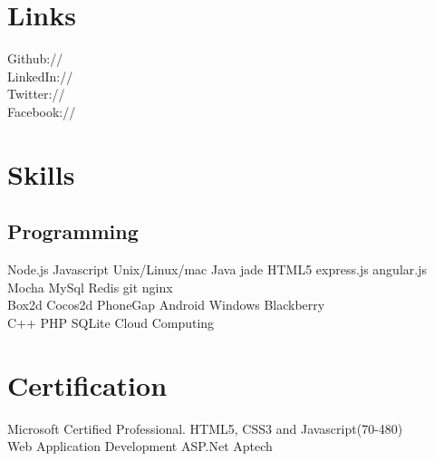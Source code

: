 \documentclass[]{deedy-resume-openfont}
\begin{document}
\begin{minipage}[t]{0.33\textwidth}

\section{Links} 
Github:// \href{https://github.com/niklabh}{} \\
LinkedIn://  \href{https://www.linkedin.com/in/niklabh}{} \\
Twitter://  \href{https://twitter.com/niklabh}{} \\
Facebook://  \href{https://facebook.com/niklabh}{}
\sectionsep


\section{Skills}
\subsection{Programming}
Node.js \textbullet{} Javascript \textbullet{}   Unix/Linux/mac \textbullet{} Java \textbullet{} jade \textbullet{} HTML5 \textbullet{} express.js \textbullet{} angular.js \textbullet{} Mocha \textbullet{} MySql \textbullet{} Redis \textbullet{} git \textbullet{} nginx  \\ 
Box2d \textbullet{} Cocos2d \textbullet{} PhoneGap \textbullet{} Android \textbullet{} Windows \textbullet{} Blackberry \\
 C++\textbullet{} PHP \textbullet{} SQLite \textbullet{} Cloud Computing
\sectionsep


\section{Certification}
Microsoft Certified Professional. HTML5, CSS3 and Javascript(70-480) \\
Web Application Development ASP.Net Aptech
\sectionsep

%
%

\end{minipage} 
\end{document}
